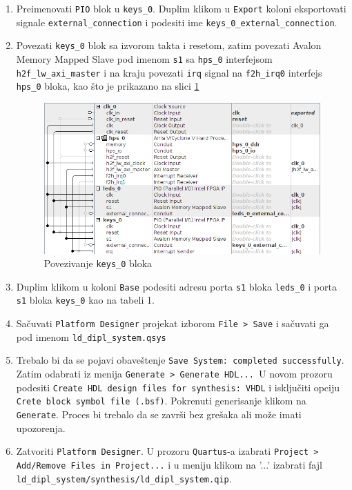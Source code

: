 \begin{enumerate}
\item  Preimenovati \texttt{PIO} blok u \texttt{keys\_0}. Duplim klikom u \texttt{Export} koloni eksportovati signale \texttt{external\_connection} i podesiti ime \texttt{keys\_0\_external\_connection}.
\item  Povezati \texttt{keys\_0} blok sa izvorom takta i resetom, zatim povezati Avalon Memory Mapped Slave pod imenom \texttt{s1} sa \texttt{hps\_0} interfejsom  \texttt{h2f\_lw\_axi\_master} i na kraju povezati \texttt{irq} signal na \texttt{f2h\_irq0} interfejs \texttt{hps\_0} bloka, kao što je prikazano na slici \ref{slika:q3}
\begin{figure}[h!]
\centering
\includegraphics[scale=0.9]{img/quartus3.png}
\caption{Povezivanje \texttt{keys\_0} bloka}
\label{slika:q3}
\end{figure}
\item  Duplim klikom u koloni \texttt{Base} podesiti adresu porta \texttt{s1} bloka \texttt{leds\_0} i porta \texttt{s1} bloka \texttt{keys\_0} kao na tabeli 1.
\item  Sačuvati \texttt{Platform Designer} projekat izborom \texttt{File > Save} i sačuvati ga pod imenom \texttt{ld\_dipl\_system.qsys}
\item  Trebalo bi da se pojavi obaveštenje \texttt{Save System: completed successfully}. Zatim odabrati iz menija \texttt{Generate > Generate HDL... }U novom prozoru podesiti \texttt{Create HDL design files for synthesis: VHDL} i isključiti opciju \texttt{Crete block symbol file (.bsf)}. Pokrenuti generisanje klikom na \texttt{Generate}. Proces bi trebalo da se završi bez grešaka ali može imati upozorenja.
\item  Zatvoriti \texttt{Platform Designer}. U prozoru \texttt{Quartus}-a izabrati \texttt{Project > Add/Remove Files in Project...} i u meniju klikom na '...' izabrati fajl \texttt{ld\_dipl\_system/synthesis/ld\_dipl\_system.qip}.

\end{enumerate}
